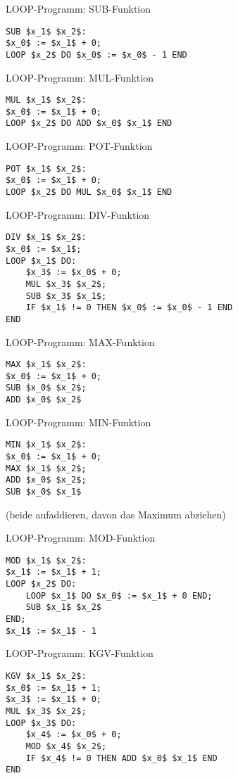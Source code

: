 \documentclass[a7paper,print,grid=both]{kartei}
\begin{document}
\begin{karte}{LOOP-Programm: SUB-Funktion}
\begin{lstlisting}[mathescape=true]
SUB $x_1$ $x_2$:
$x_0$ := $x_1$ + 0;
LOOP $x_2$ DO $x_0$ := $x_0$ - 1 END
\end{lstlisting}
\end{karte}
\begin{karte}{LOOP-Programm: MUL-Funktion}
\begin{lstlisting}[mathescape=true]
MUL $x_1$ $x_2$:
$x_0$ := $x_1$ + 0;
LOOP $x_2$ DO ADD $x_0$ $x_1$ END
\end{lstlisting}
\end{karte}
\begin{karte}{LOOP-Programm: POT-Funktion}
\begin{lstlisting}[mathescape=true]
POT $x_1$ $x_2$:
$x_0$ := $x_1$ + 0;
LOOP $x_2$ DO MUL $x_0$ $x_1$ END
\end{lstlisting}
\end{karte}
\begin{karte}{LOOP-Programm: DIV-Funktion}
\begin{lstlisting}[mathescape=true]
DIV $x_1$ $x_2$:
$x_0$ := $x_1$;
LOOP $x_1$ DO:
    $x_3$ := $x_0$ + 0;
    MUL $x_3$ $x_2$;
    SUB $x_3$ $x_1$;
    IF $x_1$ != 0 THEN $x_0$ := $x_0$ - 1 END
END
\end{lstlisting}
\end{karte}
\begin{karte}{LOOP-Programm: MAX-Funktion}
\begin{lstlisting}[mathescape=true]
MAX $x_1$ $x_2$:
$x_0$ := $x_1$ + 0;
SUB $x_0$ $x_2$;
ADD $x_0$ $x_2$
\end{lstlisting}
\end{karte}
\begin{karte}{LOOP-Programm: MIN-Funktion}
\begin{lstlisting}[mathescape=true]
MIN $x_1$ $x_2$:
$x_0$ := $x_1$ + 0;
MAX $x_1$ $x_2$;
ADD $x_0$ $x_2$;
SUB $x_0$ $x_1$
\end{lstlisting}
(beide aufaddieren, davon das Maximum abziehen)
\end{karte}
\begin{karte}{LOOP-Programm: MOD-Funktion}
\begin{lstlisting}[mathescape=true]
MOD $x_1$ $x_2$:
$x_1$ := $x_1$ + 1;
LOOP $x_2$ DO:
    LOOP $x_1$ DO $x_0$ := $x_1$ + 0 END;
    SUB $x_1$ $x_2$
END;
$x_1$ := $x_1$ - 1
\end{lstlisting}
\end{karte}
\begin{karte}{LOOP-Programm: KGV-Funktion}
\begin{lstlisting}[mathescape=true]
KGV $x_1$ $x_2$:
$x_0$ := $x_1$ + 1;
$x_3$ := $x_1$ + 0;
MUL $x_3$ $x_2$;
LOOP $x_3$ DO:
    $x_4$ := $x_0$ + 0;
    MOD $x_4$ $x_2$;
    IF $x_4$ != 0 THEN ADD $x_0$ $x_1$ END
END
\end{lstlisting}
\end{karte}
\end{document}
